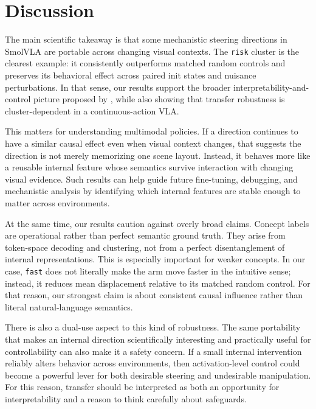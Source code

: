 \documentclass[11pt]{article}
\begin{document}
\section{Discussion}

The main scientific takeaway is that some mechanistic steering directions in SmolVLA are portable across changing visual contexts. The \texttt{risk} cluster is the clearest example: it consistently outperforms matched random controls and preserves its behavioral effect across paired init states and nuisance perturbations. In that sense, our results support the broader interpretability-and-control picture proposed by \citet{haon2025mechanistic}, while also showing that transfer robustness is cluster-dependent in a continuous-action VLA.

This matters for understanding multimodal policies. If a direction continues to have a similar causal effect even when visual context changes, that suggests the direction is not merely memorizing one scene layout. Instead, it behaves more like a reusable internal feature whose semantics survive interaction with changing visual evidence. Such results can help guide future fine-tuning, debugging, and mechanistic analysis by identifying which internal features are stable enough to matter across environments.

At the same time, our results caution against overly broad claims. Concept labels are operational rather than perfect semantic ground truth. They arise from token-space decoding and clustering, not from a perfect disentanglement of internal representations. This is especially important for weaker concepts. In our case, \texttt{fast} does not literally make the arm move faster in the intuitive sense; instead, it reduces mean displacement relative to its matched random control. For that reason, our strongest claim is about consistent causal influence rather than literal natural-language semantics.

There is also a dual-use aspect to this kind of robustness. The same portability that makes an internal direction scientifically interesting and practically useful for controllability can also make it a safety concern. If a small internal intervention reliably alters behavior across environments, then activation-level control could become a powerful lever for both desirable steering and undesirable manipulation. For this reason, transfer should be interpreted as both an opportunity for interpretability and a reason to think carefully about safeguards.
\end{document}
